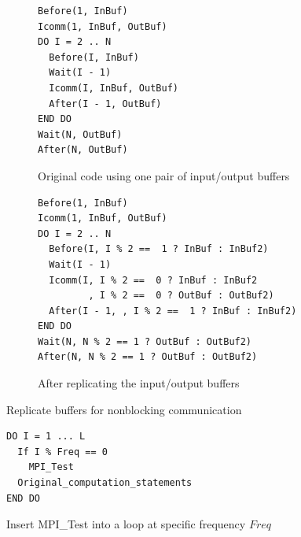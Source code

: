 \begin{figure}
{\scriptsize
  \centering
  \begin{subfigure}[b]{.4\textwidth}
\begin{verbatim}
Before(1, InBuf)
Icomm(1, InBuf, OutBuf)
DO I = 2 .. N
  Before(I, InBuf)
  Wait(I - 1)
  Icomm(I, InBuf, OutBuf)
  After(I - 1, OutBuf)
END DO
Wait(N, OutBuf)
After(N, OutBuf)
\end{verbatim}
    \caption{Original code using one pair of input/output buffers}
    \label{fig:cco:dup:a}
  \end{subfigure}
  \vspace{.01in}
  \begin{subfigure}[b]{.4\textwidth}
\begin{verbatim}
Before(1, InBuf)
Icomm(1, InBuf, OutBuf)
DO I = 2 .. N
  Before(I, I % 2 ==  1 ? InBuf : InBuf2)
  Wait(I - 1)
  Icomm(I, I % 2 ==  0 ? InBuf : InBuf2
         , I % 2 ==  0 ? OutBuf : OutBuf2)
  After(I - 1, , I % 2 ==  1 ? InBuf : InBuf2)
END DO
Wait(N, N % 2 == 1 ? OutBuf : OutBuf2)
After(N, N % 2 == 1 ? OutBuf : OutBuf2)
\end{verbatim}
    \caption{After replicating the input/output buffers}
    \label{fig:cco:dup:b}
  \end{subfigure}
\caption{Replicate buffers for nonblocking communication}
\label{fig:cco:dup}
}
\end{figure}

\begin{figure}[h]
{\scriptsize
\begin{verbatim}
DO I = 1 ... L
  If I % Freq == 0
    MPI_Test
  Original_computation_statements
END DO
\end{verbatim}
}
\caption{Insert MPI\_Test into a loop at specific frequency $Freq$}
\label{fig:cco:test}
\end{figure}

